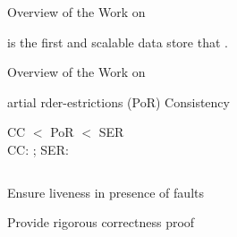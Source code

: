 
\begin{frame}{Overview of the Work on \unistore}
  \begin{center}
    \vspace{0.20cm}

    \vspace{1.00cm}
    \unistore{} is the first  and scalable  data store
    that .
  \end{center}
\end{frame}

\begin{frame}{Overview of the Work on \unistore}
  \begin{center}
    {artial rder-estrictions (PoR) Consistency}

    \vspace{0.30cm}
    CC $<$ PoR $<$ SER \\[6pt]
    CC: \cc; SER: \ser

    \vspace{1.20cm}
    \begin{columns}
      \begin{description}
        \item[\red{Key Challenges (I):}] Ensure liveness in presence of faults \\[10pt]
        \item[\red{Key Challenges (II):}] Provide rigorous correctness proof
      \end{description}
    \end{columns}
  \end{center}
\end{frame}

